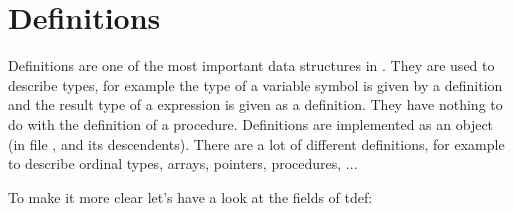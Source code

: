 \section{Definitions}

Definitions are one of the most important data structures in \fpc.
They are used to describe types, for example the type of a variable
symbol is given by a definition and the result type
of a expression is given as a definition.
They have nothing to do with the definition of a procedure.
Definitions are implemented as an object (in file ,
 and its descendents). There are a lot of different
definitions, for example to describe
ordinal types, arrays, pointers, procedures, ...

To make it more clear let's have a look at the fields of tdef:



\label{ch:parse_tree}

\label{ch:parser}

\label{ch:semantical_analysis}

